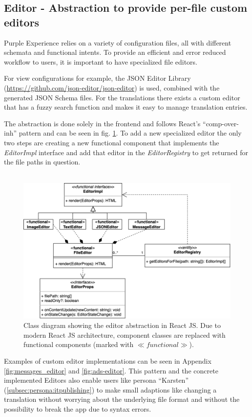 \subsection{Editor - Abstraction to provide per-file custom editors}

Purple Experience relies on a variety of configuration files, all with different schemata and functional intents.
To provide an efficient and error reduced workflow to users, it is important to have specialized file editors.

For view configurations for example, the JSON Editor Library (\url{https://github.com/json-editor/json-editor}) is used, combined with the generated JSON Schema files. For the translations there exists a custom editor that has a fuzzy search function and makes it easy to manage translation entries.

The abstraction is done solely in the frontend and follows React's ``\Gls{comp-over-inh}'' pattern and can be seen in fig. \ref{fig:abstract-editor}.
To add a new specialized editor the only two steps are creating a new functional component that implements the \textit{EditorImpl} interface
and add that editor in the \textit{EditorRegistry} to get returned for the file paths in question.
\\\\
\begin{figure}[h!]
  \includegraphics[width=\textwidth]{pics/abstract_editor_uml.drawio.png}
  \caption{Class diagram showing the editor abstraction in React JS. Due to modern React JS architecture, component classes are replaced with functional components (marked with $\ll functional\gg$).}
  \label{fig:abstract-editor}
\end{figure}
Examples of custom editor implementations can be seen in Appendix \ref{fig:messages_editor} and \ref{fig:ads-editor}.
This pattern and the concrete implemented Editors also enable users like persona ``Karsten'' (\ref{subsec:persona:itpublishing}) to make small adaptions like changing a translation without worrying about
the underlying file format and without the possibility to break the app due to syntax errors.


